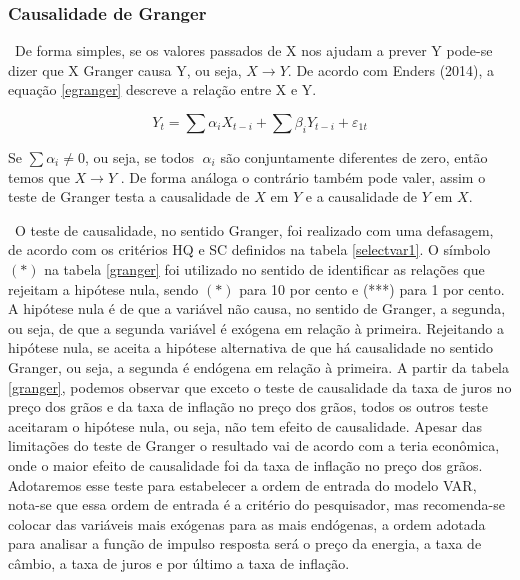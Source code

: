 \documentclass[a4paper,12pt,oneside,titlepage]{article}
\begin{document}
\subsubsection{Causalidade de Granger}

\ De forma simples, se os valores passados de X nos ajudam a prever Y pode-se dizer que X Granger causa Y, ou seja, $X\longrightarrow Y$. De acordo com Enders (2014), a equação \eqref{egranger} descreve a relação entre X e Y. 

\begin{equation}
\label{egranger}
Y_t = \sum \alpha_i X_{t-i} + \sum \beta_i Y_{t-i} + \varepsilon_{1t}
\end{equation}

Se $\sum \alpha_i \neq 0$, ou seja, se todos $\alpha_i$ são conjuntamente diferentes de zero, então temos que $X\longrightarrow Y$ . De forma análoga o contrário também pode valer, assim o teste de Granger testa a causalidade de $X$ em $Y$ e a causalidade de $Y$ em $X$.
      
\ O teste de causalidade, no sentido Granger, foi realizado com uma defasagem, de acordo com os critérios HQ e SC definidos na tabela \ref{selectvar1}. O símbolo $(*)$ na tabela \ref{granger} foi utilizado no sentido de identificar as relações que rejeitam a hipótese nula, sendo $(*)$ para 10 por cento e (***) para 1 por cento.  A hipótese nula é de que a variável não causa, no sentido de Granger, a segunda, ou seja, de que a segunda variável é 
exógena em relação à primeira. Rejeitando a hipótese nula, se aceita a hipótese
alternativa de que há causalidade no sentido Granger, ou seja, a segunda é endógena em
relação à primeira. A partir da tabela \ref{granger}, podemos observar que exceto o teste de causalidade da taxa de juros no preço dos grãos e da taxa de inflação no preço dos grãos, todos os outros teste aceitaram o hipótese nula, ou seja, não tem efeito de causalidade. Apesar das limitações do teste de Granger o resultado vai de acordo com a teria econômica, onde o maior efeito de causalidade foi da taxa de inflação no preço dos grãos. Adotaremos esse teste para estabelecer a ordem de entrada do modelo VAR, nota-se que essa ordem de entrada é a critério do pesquisador, mas recomenda-se colocar das variáveis mais exógenas para as mais endógenas, a ordem adotada para analisar a função de impulso resposta será o preço da energia, a taxa de câmbio, a taxa de juros e por último a taxa de inflação. 
\end{document}
